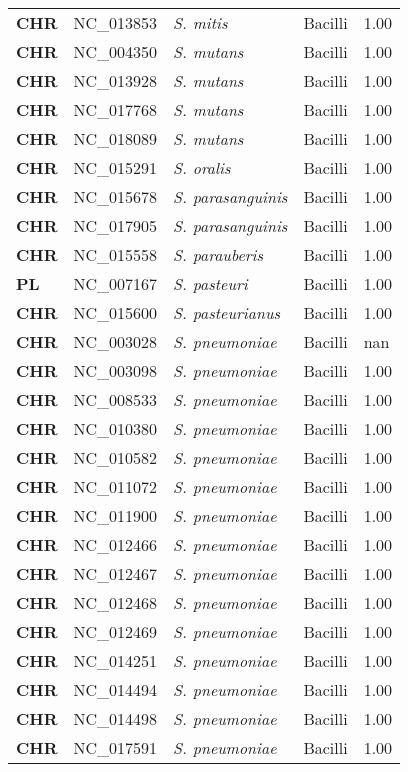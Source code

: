 \begin{adjustwidth}{-3cm}{2cm}
{\begin{supertabular}{>{\bfseries}l|p{0.1\textwidth}p{0.14\textwidth}l|l}
CHR & NC\_013853 & \textit{S. mitis} & Bacilli & 1.00\\
CHR & NC\_004350 & \textit{S. mutans} & Bacilli & 1.00\\
CHR & NC\_013928 & \textit{S. mutans} & Bacilli & 1.00\\
CHR & NC\_017768 & \textit{S. mutans} & Bacilli & 1.00\\
CHR & NC\_018089 & \textit{S. mutans} & Bacilli & 1.00\\
CHR & NC\_015291 & \textit{S. oralis} & Bacilli & 1.00\\
CHR & NC\_015678 & \textit{S. parasanguinis} & Bacilli & 1.00\\
CHR & NC\_017905 & \textit{S. parasanguinis} & Bacilli & 1.00\\
CHR & NC\_015558 & \textit{S. parauberis} & Bacilli & 1.00\\
PL & NC\_007167 & \textit{S. pasteuri} & Bacilli & 1.00\\
CHR & NC\_015600 & \textit{S. pasteurianus} & Bacilli & 1.00\\
CHR & NC\_003028 & \textit{S. pneumoniae} & Bacilli & nan\\
CHR & NC\_003098 & \textit{S. pneumoniae} & Bacilli & 1.00\\
CHR & NC\_008533 & \textit{S. pneumoniae} & Bacilli & 1.00\\
CHR & NC\_010380 & \textit{S. pneumoniae} & Bacilli & 1.00\\
CHR & NC\_010582 & \textit{S. pneumoniae} & Bacilli & 1.00\\
CHR & NC\_011072 & \textit{S. pneumoniae} & Bacilli & 1.00\\
CHR & NC\_011900 & \textit{S. pneumoniae} & Bacilli & 1.00\\
CHR & NC\_012466 & \textit{S. pneumoniae} & Bacilli & 1.00\\
CHR & NC\_012467 & \textit{S. pneumoniae} & Bacilli & 1.00\\
CHR & NC\_012468 & \textit{S. pneumoniae} & Bacilli & 1.00\\
CHR & NC\_012469 & \textit{S. pneumoniae} & Bacilli & 1.00\\
CHR & NC\_014251 & \textit{S. pneumoniae} & Bacilli & 1.00\\
CHR & NC\_014494 & \textit{S. pneumoniae} & Bacilli & 1.00\\
CHR & NC\_014498 & \textit{S. pneumoniae} & Bacilli & 1.00\\
CHR & NC\_017591 & \textit{S. pneumoniae} & Bacilli & 1.00\\

\end{supertabular}}
\end{adjustwidth}
